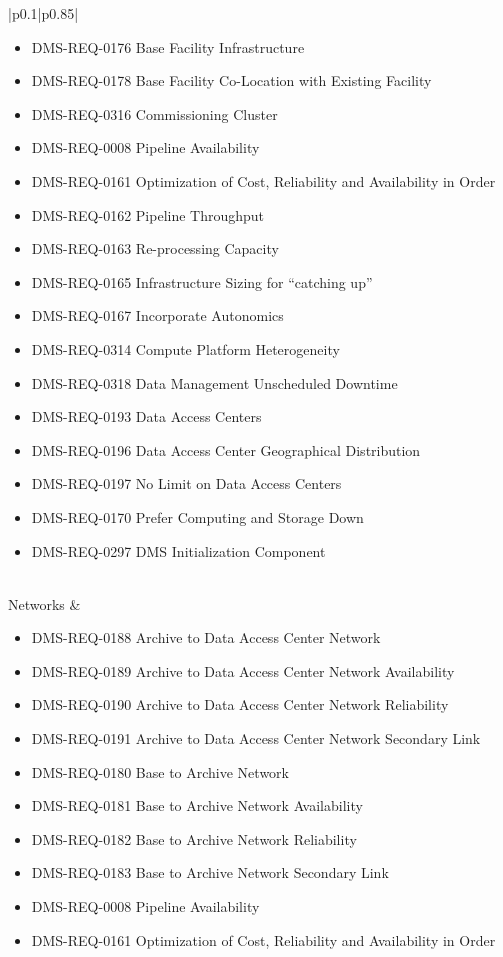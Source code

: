 \documentclass[DM,lsstdraft,toc]{lsstdoc}
\begin{document}
\begin{xtabular}{|p{0.1\textwidth}|p{0.85\textwidth}|}
\begin{itemize}
\item DMS-REQ-0176 Base Facility Infrastructure
\item DMS-REQ-0178 Base Facility Co-Location with Existing Facility
\item DMS-REQ-0316 Commissioning Cluster
\item DMS-REQ-0008 Pipeline Availability
\item DMS-REQ-0161 Optimization of Cost, Reliability and Availability in Order
\item DMS-REQ-0162 Pipeline Throughput
\item DMS-REQ-0163 Re-processing Capacity
\item DMS-REQ-0165 Infrastructure Sizing for ``catching up''
\item DMS-REQ-0167 Incorporate Autonomics
\item DMS-REQ-0314 Compute Platform Heterogeneity
\item DMS-REQ-0318 Data Management Unscheduled Downtime
\item DMS-REQ-0193 Data Access Centers
\item DMS-REQ-0196 Data Access Center Geographical Distribution
\item DMS-REQ-0197 No Limit on Data Access Centers
\item DMS-REQ-0170 Prefer Computing and Storage Down
\item DMS-REQ-0297 DMS Initialization Component \end{itemize} \\ \hline
Networks &
\begin{itemize} \item DMS-REQ-0188 Archive to Data Access Center Network
\item DMS-REQ-0189 Archive to Data Access Center Network Availability
\item DMS-REQ-0190 Archive to Data Access Center Network Reliability
\item DMS-REQ-0191 Archive to Data Access Center Network Secondary Link
\item DMS-REQ-0180 Base to Archive Network
\item DMS-REQ-0181 Base to Archive Network Availability
\item DMS-REQ-0182 Base to Archive Network Reliability
\item DMS-REQ-0183 Base to Archive Network Secondary Link
\item DMS-REQ-0008 Pipeline Availability
\item DMS-REQ-0161 Optimization of Cost, Reliability and Availability in Order

\end{itemize}
\end{xtabular}
\end{document}
